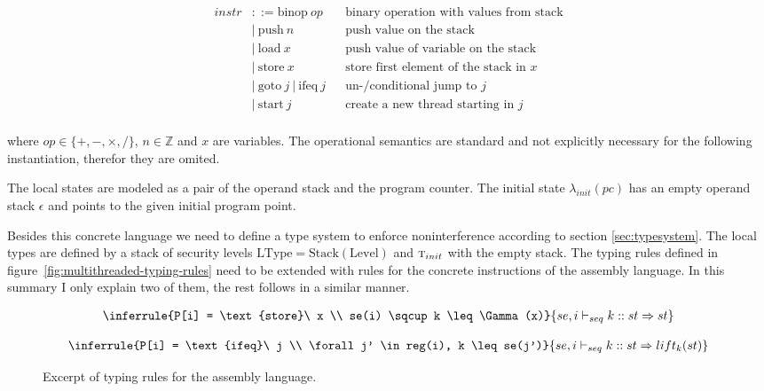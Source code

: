 \documentclass[a4paper,10pt]{llncs}
\begin{document}
\begin{align*}
instr &::= \text{binop}\ op && \text{binary operation with values from stack} \\
&|\ \text{push}\ n &&  \text{push value on the stack} \\
&|\ \text{load}\ x && \text{push value of variable on the stack} \\
&|\ \text{store}\ x && \text{store first element of the stack in $x$} \\
&|\ \text{goto}\ j\ |\ \text{ifeq}\ j && \text{un-/conditional jump to $j$} \\
&|\ \text{start}\ j && \text{create a new thread starting in $j$} \\
\end{align*}

where $op \in \{+,-,\times,/\}$, $n \in \mathbb{Z}$ and $x$ are variables. The
operational semantics are standard and not explicitly necessary for the following
instantiation, therefor they are omited.

The local states are modeled as a pair of the operand stack and the program counter. The
initial state $\lambda_{init}(pc)$ has an empty operand stack $\epsilon$ and points to
the given initial program point.

Besides this concrete language we need to define a type system to enforce noninterference
according to section \ref{sec:typesystem}. The local types are defined by a stack of security levels
$\text{LType} = \text{Stack}(\text{Level})$ and $\textsc{t}_{init}$ with the empty stack. The typing rules defined in
figure~\ref{fig:multithreaded-typing-rules} need to be extended with rules for the concrete instructions
of the assembly language. In this summary I only explain two of them, the rest follows
in a similar manner.

\begin{figure}
\begin{minipage}{.5\textwidth}
\begin{align*}
\inferrule{P[i] = \text{store}\ x \\ se(i) \sqcup k \leq \Gamma(x)}
{se, i \vdash_{seq} k :: st \Rightarrow st}
\end{align*}
\end{minipage}
\begin{minipage}{.5\textwidth}
\begin{align*}
\inferrule{P[i] = \text{ifeq}\ j \\ \forall j' \in reg(i), k \leq se(j')}
{se, i \vdash_{seq} k :: st \Rightarrow lift_k(st)}
\end{align*}
\end{minipage}
\caption{Excerpt of typing rules for the assembly language.}
\label{fig:transfer-rules}
\end{figure}
\end{document}
